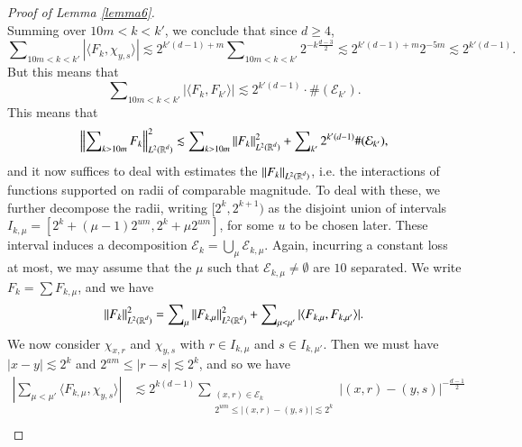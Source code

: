\begin{proof}[Proof of Lemma \ref{lemma6}]
\begin{equation}
    \end{equation}
    Summing over $10m < k < k'$, we conclude that since $d \geq 4$,
    \begin{equation}
      \sum\nolimits_{10m < k < k'} |\langle F_k, \chi_{y,s} \rangle| \lesssim 2^{k'(d-1) + m} \sum\nolimits_{10m < k < k'} 2^{-k \frac{d-3}{2}} \lesssim 2^{k'(d-1) + m} 2^{-5m} \lesssim 2^{k'(d-1)}.
    \end{equation}
    But this means that
    \begin{equation}
      \sum\nolimits_{10m < k < k'} |\langle F_k, F_{k'} \rangle| \lesssim 2^{k'(d-1)} \cdot \# ( \mathcal{E}_{k'} ).
    \end{equation}
    This means that
    \begin{equation} \label{awiodjwaoidfjawoid12343124134123453}
      \left\| \sum\nolimits_{k > 10m} F_k \right\|_{L^2(\operatorname{\mathbb{R}}^d)}^2 \lesssim \sum\nolimits_{k > 10m} \| F_k \|_{L^2(\operatorname{\mathbb{R}}^d)}^2 + \sum\nolimits_{k'} 2^{k'(d-1)} \# (\mathcal{E}_{k'}),
    \end{equation}
    and it now suffices to deal with estimates the $\| F_k \|_{L^2(\operatorname{\mathbb{R}}^d)}$, i.e. the interactions of functions supported on radii of comparable magnitude. To deal with these, we further decompose the radii, writing $[2^k,2^{k+1})$ as the disjoint union of intervals $I_{k,\mu} = [2^k + (\mu - 1) 2^{um}, 2^k + \mu 2^{um}]$, for some $u$ to be chosen later. These interval induces a decomposition $\mathcal{E}_k = \bigcup_\mu \mathcal{E}_{k,\mu}$. Again, incurring a constant loss at most, we may assume that the $\mu$ such that $\mathcal{E}_{k,\mu} \neq \emptyset$ are $10$ separated. We write $F_k = \sum F_{k,\mu}$, and we have
    \begin{equation}
      \| F_k \|_{L^2(\operatorname{\mathbb{R}}^d)}^2 = \sum\nolimits_\mu \| F_{k,\mu} \|_{L^2(\operatorname{\mathbb{R}}^d)}^2 + \sum\nolimits_{\mu < \mu'} |\langle F_{k,\mu}, F_{k,\mu'} \rangle|.
    \end{equation}
    We now consider $\chi_{x,r}$ and $\chi_{y,s}$ with $r \in I_{k,\mu}$ and $s \in I_{k,\mu'}$. Then we must have $|x - y| \lesssim 2^k$ and $2^{am} \leq |r - s| \lesssim 2^k$, and so we have
    \begin{equation}
    \begin{split}
        \left| \sum\nolimits_{\mu < \mu'} \langle F_{k,\mu}, \chi_{y,s} \rangle \right| &\lesssim 2^{k(d-1)} \sum\nolimits_{\substack{(x,r) \in \mathcal{E}_k\\ 2^{um} \leq |(x,r) - (y,s)| \lesssim 2^k}} |(x,r) - (y,s)|^{- \frac{d-1}{2}}\\

\end{split}
\end{equation}
\end{proof}
